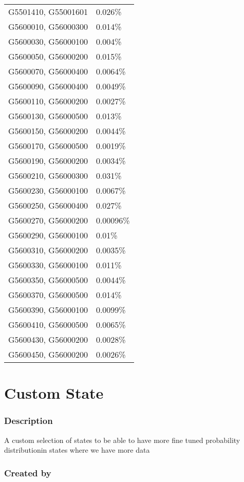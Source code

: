 \begin{longtable}[]{@{}ll@{}}
G5501410, G55001601 & 0.026\% \\
G5600010, G56000300 & 0.014\% \\
G5600030, G56000100 & 0.004\% \\
G5600050, G56000200 & 0.015\% \\
G5600070, G56000400 & 0.0064\% \\
G5600090, G56000400 & 0.0049\% \\
G5600110, G56000200 & 0.0027\% \\
G5600130, G56000500 & 0.013\% \\
G5600150, G56000200 & 0.0044\% \\
G5600170, G56000500 & 0.0019\% \\
G5600190, G56000200 & 0.0034\% \\
G5600210, G56000300 & 0.031\% \\
G5600230, G56000100 & 0.0067\% \\
G5600250, G56000400 & 0.027\% \\
G5600270, G56000200 & 0.00096\% \\
G5600290, G56000100 & 0.01\% \\
G5600310, G56000200 & 0.0035\% \\
G5600330, G56000100 & 0.011\% \\
G5600350, G56000500 & 0.0044\% \\
G5600370, G56000500 & 0.014\% \\
G5600390, G56000100 & 0.0099\% \\
G5600410, G56000500 & 0.0065\% \\
G5600430, G56000200 & 0.0028\% \\
G5600450, G56000200 & 0.0026\% \\
\end{longtable}

\section{Custom State}\label{custom_state}

\subsubsection{Description}\label{description-30}

A custom selection of states to be able to have more fine tuned
probability distributionin states where we have more data

\subsubsection{Created by}\label{created-by-30}

